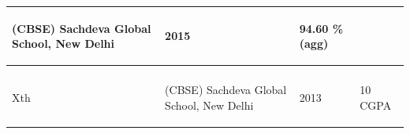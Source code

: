 \documentclass[11pt]{article}
\begin{document}
\begin{center}
\begin{small}
\begin{tabular}{ |m{5.5cm} m{5.5cm} m{2cm} m{4.5cm}| }
\begin{center}

(CBSE) Sachdeva Global School, New Delhi

\end{center}&

\begin{center}

2015

\end{center}&

\begin{center}

94.60 \%(agg)

\end{center}\\

\hline

\begin{center}

AISSE\\

Xth

\end{center}&

\begin{center}

(CBSE) Sachdeva Global School, New Delhi

\end{center}&

\begin{center}

2013

\end{center}&

\begin{center}

10 CGPA

\end{center}\\

\hline

\end{tabular}
\end{small}
\end{center}
\end{document}
